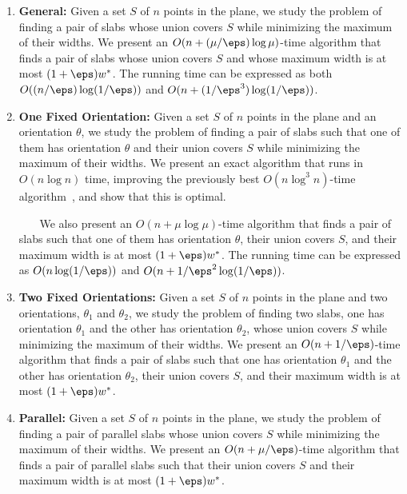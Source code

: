 \begin{enumerate}
    \item \textbf{\textsf{General:}}
    Given a set $S$ of $n$ points in the plane, we study the problem of finding a pair of slabs whose union covers $S$ while minimizing the maximum of their widths. 
    We present an $O(n + (\mu/\eps)\log \mu )$-time algorithm that finds a pair of slabs whose union covers $S$ and whose maximum width is at most $(1+\eps)w^*$. The running time can be expressed as both $O((n/\eps)\log(1/\eps))$ and $O(n + (1/\eps^3)\log(1/\eps))$. 

    \item \textbf{\textsf{One Fixed Orientation:}} 
    Given a set $S$ of $n$ points in the plane and an orientation $\theta$, we study the problem of finding a pair of slabs such that one of them has orientation $\theta$ and their union covers $S$ while minimizing the maximum of their widths. 
    We present an exact algorithm that runs in $O(n\log n)$ time, improving the previously best $O(n\log^3 n)$-time algorithm~\cite{ahn2024constrained}, and show that this is optimal. 
    
    ~$\quad$ We also present an $O(n+ \mu \log \mu)$-time algorithm that finds a pair of slabs such that one of them has orientation $\theta$, their union covers $S$, and their maximum width is at most $(1+\eps)w^*$.
    The running time can be expressed as $O(n\log (1/\eps))$ and $O(n + 1/\eps^2 \log (1/\eps))$.

    \item \textbf{\textsf{Two Fixed Orientations:}}
    Given a set $S$ of $n$ points in the plane and two orientations, $\theta_1$ and $\theta_2$, we study the problem of finding two slabs, one has orientation $\theta_1$ and the other has orientation $\theta_2$, whose union covers $S$ while minimizing the maximum of their widths. 
    We present an $O(n+ 1/\eps)$-time algorithm that finds a pair of slabs such that 
    one has orientation $\theta_1$ and the other has orientation $\theta_2$, their union covers $S$, and their maximum width is at most $(1+\eps)w^*$.

    \item \textbf{\textsf{Parallel:}}
    Given a set $S$ of $n$ points in the plane, we study the problem of finding a pair of parallel slabs whose union covers $S$ while minimizing the maximum of their widths. 
    We present an $O(n + \mu / \eps)$-time algorithm that finds a pair of parallel slabs such that their union covers $S$ and their maximum width is at most $(1+\eps)w^*$. 
\end{enumerate}





